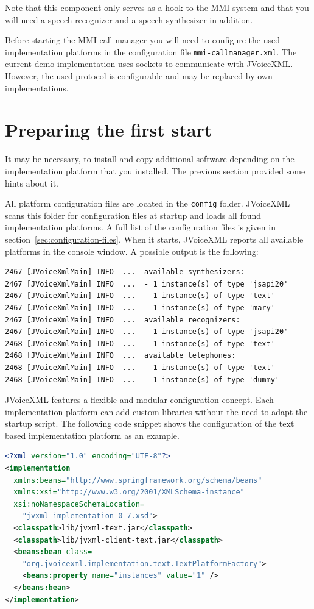\documentclass[11pt,a4paper]{book}
\begin{document}
Note that this component only serves as a hook to the MMI system and that you
will need a speech recognizer and a speech synthesizer in addition.

Before starting the MMI call manager you will need to configure the used
implementation platforms in the configuration file \texttt{mmi-callmanager.xml}.
The current demo implementation uses sockets to communicate with JVoiceXML.
However, the used protocol is configurable and may be replaced by own
implementations.

\section{Preparing the first start}
\label{sec:impl-platform-config}

It may be necessary, to install and copy additional software depending on the
implementation platform that you installed. The previous section provided some
hints about it.

All platform configuration files are located in the \lstinline{config} folder.
JVoiceXML scans this folder for configuration files at startup and loads all found
implementation platforms. A full list of the configuration files is
given in section~\ref{sec:configuration-files}. When it starts, JVoiceXML
reports all available platforms in the console window. A possible output is the
following:

\begin{lstlisting}
2467 [JVoiceXmlMain] INFO  ...  available synthesizers:
2467 [JVoiceXmlMain] INFO  ...  - 1 instance(s) of type 'jsapi20'
2467 [JVoiceXmlMain] INFO  ...  - 1 instance(s) of type 'text'
2467 [JVoiceXmlMain] INFO  ...  - 1 instance(s) of type 'mary'
2467 [JVoiceXmlMain] INFO  ...  available recognizers:
2467 [JVoiceXmlMain] INFO  ...  - 1 instance(s) of type 'jsapi20'
2468 [JVoiceXmlMain] INFO  ...  - 1 instance(s) of type 'text'
2468 [JVoiceXmlMain] INFO  ...  available telephones:
2468 [JVoiceXmlMain] INFO  ...  - 1 instance(s) of type 'text'
2468 [JVoiceXmlMain] INFO  ...  - 1 instance(s) of type 'dummy'
\end{lstlisting}

JVoiceXML features a flexible and modular configuration concept. Each
implementation platform can add custom libraries without the need to adapt the
startup script. The following code snippet shows the configuration of the text
based implementation platform as an example.

\begin{lstlisting}[language=XML]
<?xml version="1.0" encoding="UTF-8"?>
<implementation
  xmlns:beans="http://www.springframework.org/schema/beans"
  xmlns:xsi="http://www.w3.org/2001/XMLSchema-instance"
  xsi:noNamespaceSchemaLocation=
    "jvxml-implementation-0-7.xsd">
  <classpath>lib/jvxml-text.jar</classpath>
  <classpath>lib/jvxml-client-text.jar</classpath>
  <beans:bean class=
    "org.jvoicexml.implementation.text.TextPlatformFactory">
    <beans:property name="instances" value="1" />
  </beans:bean>
</implementation>
\end{lstlisting}
\end{document}
